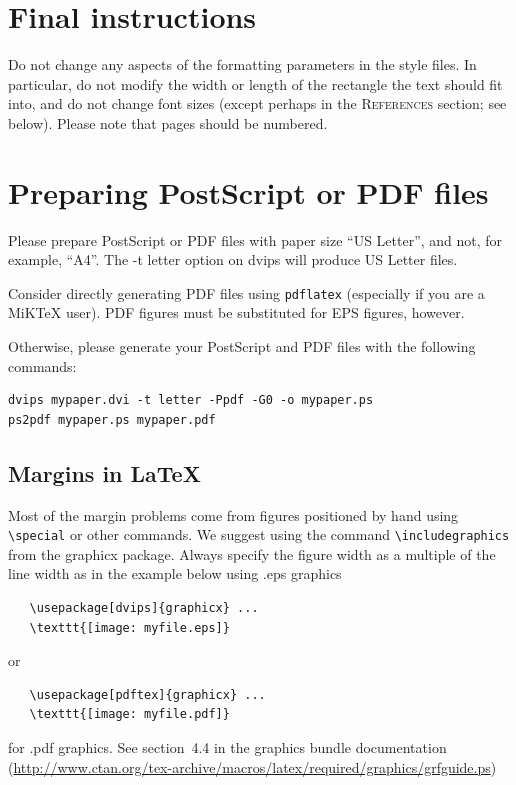 \documentclass{article} %
\begin{document}
\section{Final instructions}
Do not change any aspects of the formatting parameters in the style files.
In particular, do not modify the width or length of the rectangle the text
should fit into, and do not change font sizes (except perhaps in the
\textsc{References} section; see below). Please note that pages should be
numbered.

\section{Preparing PostScript or PDF files}

Please prepare PostScript or PDF files with paper size ``US Letter'', and
not, for example, ``A4''. The -t
letter option on dvips will produce US Letter files.

Consider directly generating PDF files using \verb+pdflatex+
(especially if you are a MiKTeX user).
PDF figures must be substituted for EPS figures, however.

Otherwise, please generate your PostScript and PDF files with the following commands:
\begin{verbatim}
dvips mypaper.dvi -t letter -Ppdf -G0 -o mypaper.ps
ps2pdf mypaper.ps mypaper.pdf
\end{verbatim}

\subsection{Margins in LaTeX}

Most of the margin problems come from figures positioned by hand using
\verb+\special+ or other commands. We suggest using the command
\verb+\includegraphics+
from the graphicx package. Always specify the figure width as a multiple of
the line width as in the example below using .eps graphics
\begin{verbatim}
   \usepackage[dvips]{graphicx} ...
   \texttt{[image: myfile.eps]}
\end{verbatim}
or %
\begin{verbatim}
   \usepackage[pdftex]{graphicx} ...
   \texttt{[image: myfile.pdf]}
\end{verbatim}
for .pdf graphics.
See section~4.4 in the graphics bundle documentation (\url{http://www.ctan.org/tex-archive/macros/latex/required/graphics/grfguide.ps})
\end{document}
